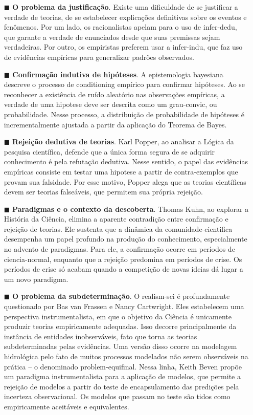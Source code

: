 \documentclass[./main.tex]{subfiles}
\begin{document}
\begin{itemize}
    \item[$\blacksquare$] \textbf{O problema da justificação}. Existe uma dificuldade de se justificar a verdade de teorias, de se estabelecer explicações definitivas sobre os eventos e fenômenos. Por um lado, os racionalistas apelam para o uso de \gls{infer-dedu}, que garante a verdade de enunciados desde que suas premissas sejam verdadeiras. Por outro, os empiristas preferem usar a \gls{infer-indu}, que faz uso de evidências empíricas para generalizar padrões observados.
    \item  [$\blacksquare$] \textbf{Confirmação indutiva de hipóteses}. A epistemologia bayesiana descreve o processo de \gls{conditioning} empírico para confirmar hipóteses. Ao se reconhecer a existência de ruído aleatório nas observações empíricas, a verdade de uma \gls{hipotese} deve ser descrita como um \gls{grau-convic}, ou probabilidade. Nesse processo, a distribuição de probabilidade de hipóteses é incrementalmente ajustada a partir da aplicação do Teorema de Bayes. 
    \item[$\blacksquare$] \textbf{Rejeição dedutiva de teorias}. Karl Popper, ao analisar a Lógica da pesquisa científica, defende que a única forma segura de se adquirir conhecimento é pela refutação dedutiva. Nesse sentido, o papel das evidências empíricas consiste em testar uma \gls{hipotese} a partir de contra-exemplos que provam sua falsidade. Por esse motivo, Popper alega que as teorias científicas devem ser teorias falseáveis, que permitem sua própria rejeição.  
    \item     [$\blacksquare$] \textbf{Paradigmas e o contexto da descoberta}. Thomas Kuhn, ao explorar a História da Ciência, elimina a aparente contradição entre confirmação e rejeição de teorias. Ele sustenta que a dinâmica da \gls{comunidade-cientifica} desempenha um papel profundo na produção do conhecimento, especialmente no advento de paradigmas. Para ele, a confirmação ocorre em períodos de \gls{ciencia-normal}, enquanto que a rejeição predomina em períodos de crise. Os períodos de crise só acabam quando a competição de novas ideias dá lugar a um novo \gls{paradigma}.
    \item[$\blacksquare$] \textbf{O problema da subdeterminação}. O \gls{realism-sci} é profundamente questionado por Bas van Frassen e Nancy Cartwright. Eles estabelecem uma perspectiva instrumentalista, em que o objetivo da Ciência é unicamente produzir teorias empiricamente adequadas. Isso decorre principalmente da instância de entidades inobserváveis, fato que torna as teorias subdeterminadas pelas evidências. Uma versão disso ocorre na modelagem hidrológica pelo fato de muitos processos modelados não serem observáveis na prática -- o denominado \gls{problem-equifinal}. Nessa linha, Keith Beven propõe um \gls{paradigma} instrumentalista para a aplicação de modelos, que permite a rejeição de modelos a partir do teste de encapsulamento das predições pela incerteza observacional. Os modelos que passam no teste são tidos como empiricamente aceitáveis e equivalentes.  
\end{itemize}
\end{document}
